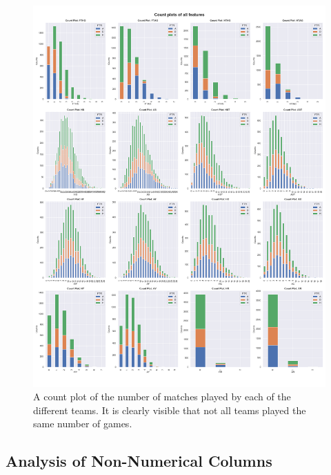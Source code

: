 \documentclass[a4paper,12pt]{article}
\begin{document}
		\begin{figure}[H]
			\centering
			
			\includegraphics[scale=0.32]{count_plot_all.png}
			\caption{A count plot of the number of matches played by each of the different teams. It is clearly visible that not all teams played the same number of games.}
		\end{figure}
		
	\subsection{Analysis of Non-Numerical Columns}
		
\end{document}
